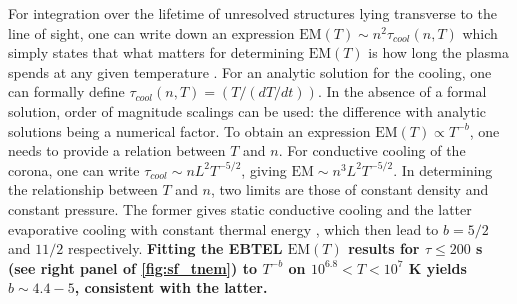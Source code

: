\documentclass[]{aastex}
\begin{document}
		\par For integration over the lifetime of unresolved structures lying transverse to the line of sight, one can write down an expression $\mathrm{EM}(T) \sim n^2\tau_{cool}(n, T)$ which simply states that what matters for determining $\mathrm{EM}(T)$ is how long the plasma spends at any given temperature \citep[e.g.][]{cargill_implications_1994,cargill_nanoflare_2004}. For an analytic solution for the cooling, one can formally define $\tau_{cool}(n, T) = (T/(dT/dt))$. In the absence of a formal solution, order of magnitude scalings can be used: the difference with analytic solutions being a numerical factor. To obtain an expression $\mathrm{EM}(T)\propto T^{-b}$, one needs to provide a relation between $T$ and $n$. For conductive cooling of the corona, one can write $\tau_{cool} \sim nL^2T^{-5/2}$, giving $\mathrm{EM} \sim n^3L^2T^{-5/2}$. In determining the relationship between $T$ and $n$, two limits are those of constant density and constant pressure. The former gives static conductive cooling \citep[e.g.][]{antiochos_influence_1976} and the latter evaporative cooling with constant thermal energy \citep[e.g.][]{antiochos_evaporative_1978}, which then lead to $b = 5/2$ and $11/2$ respectively. \textbf{Fitting the EBTEL $\mathrm{EM}(T)$ results for $\tau\le200$ s (see right panel of \autoref{fig:sf_tnem}) to $T^{-b}$ on $10^{6.8}<T<10^{7}$ K yields $b\sim4.4-5$, consistent with the latter.}
\end{document}
